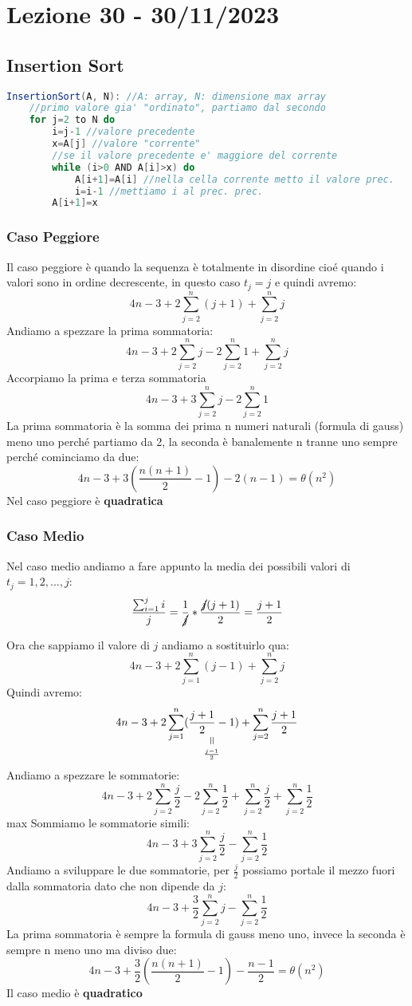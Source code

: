 \section{Lezione 30 - 30/11/2023}
\subsection{Insertion Sort}

\begin{lstlisting}[language=Java]
InsertionSort(A, N): //A: array, N: dimensione max array 
    //primo valore gia' "ordinato", partiamo dal secondo
    for j=2 to N do
        i=j-1 //valore precedente
        x=A[j] //valore "corrente"
        //se il valore precedente e' maggiore del corrente
        while (i>0 AND A[i]>x) do 
            A[i+1]=A[i] //nella cella corrente metto il valore prec.
            i=i-1 //mettiamo i al prec. prec.
        A[i+1]=x
\end{lstlisting}


\subsubsection{Caso Peggiore}
Il caso peggiore è quando la sequenza è totalmente in disordine cioé quando i valori sono in ordine decrescente, in questo caso $t_j=j$ e quindi avremo:
$$ 4n-3+2\sum_{j=2}^n (j+1) + \sum_{j=2}^n j $$
Andiamo a spezzare la prima sommatoria:
$$ 4n-3+2\sum_{j=2}^n j - 2\sum_{j=2}^n 1 + \sum_{j=2}^n j $$
Accorpiamo la prima e terza sommatoria
$$ 4n-3+3\sum_{j=2}^n j - 2\sum_{j=2}^n 1 $$
La prima sommatoria è la somma dei prima n numeri naturali (formula di gauss) meno uno perché partiamo da 2, la seconda è banalemente n tranne uno sempre perché cominciamo da due:
$$ 4n -3 +3(\frac{n(n+1)}{2}-1) - 2(n-1) = \theta(n^2) $$
Nel caso peggiore è \textbf{quadratica}

\subsubsection{Caso Medio}
Nel caso medio andiamo a fare appunto la media dei possibili valori di $t_j=1,2,...,j$:
$$ \frac{\sum_{i=1}^j i}{j} = \frac{1}{\cancel{j}}*\frac{\cancel{j}(j+1)}{2} = \frac{j+1}{2} $$

Ora che sappiamo il valore di $j$ andiamo a sostituirlo qua:
$$ 4n-3+2\sum_{j=1}^n (j-1) + \sum_{j=2}^n j $$
Quindi avremo:
$$ 4n-3+2\sum_{j=1}^n (\equalto{\frac{j+1}{2}-1}{\frac{j-1}{2}}) + \sum_{j=2}^n \frac{j+1}{2} $$
Andiamo a spezzare le sommatorie:
$$ 4n-3+2\sum_{j=2}^{n} \frac{j}{2} - 2 \sum_{j=2}^n \frac{1}{2} + \sum_{j=2}^{n} \frac{j}{2} + \sum_{j=2}^{n} \frac{1}{2}$$max
Sommiamo le sommatorie simili:
$$ 4n-3+3\sum_{j=2}^{n} \frac{j}{2} - \sum_{j=2}^n \frac{1}{2} $$
Andiamo a sviluppare le due sommatorie, per $\frac{j}{2}$ possiamo portale il mezzo fuori dalla sommatoria dato che non dipende da $j$:
$$ 4n-3+\frac{3}{2}\sum_{j=2}^{n} j - \sum_{j=2}^n \frac{1}{2} $$
La prima sommatoria è sempre la formula di gauss meno uno, invece la seconda è sempre n meno uno ma diviso due:
$$ 4n-3+\frac{3}{2}(\frac{n(n+1)}{2} -1) - \frac{n-1}{2} = \theta(n^2)$$
Il caso medio è \textbf{quadratico}

